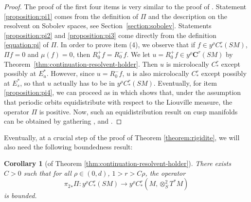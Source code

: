 \documentclass[10pt]{amsart}
\newcommand{\bC}{\boldsymbol{C}}
\theoremstyle{plain}
\newtheorem{corollary}{Corollary}[section]
\theoremstyle{definition}
\begin{document}
\begin{proof}
The proof of the first four items is very similar to the proof of \cite[Th.\,1.1]{Guillarmou-17-1}. Statement \eqref{proposition:pi1} comes from the definition of $\Pi$ and the description on the resolvent on Sobolev spaces, see Section~\ref{section:sobolev}. Statements \eqref{proposition:pi2} and \eqref{proposition:pi3} come directly from the definition \eqref{equation:pi} of $\Pi$. In order to prove item (4), we observe that if $f \in y^\rho C^r_*(SM)$, $\Pi f =0$ and $\mu(f) = 0$, then $R_0^+ f = R_0^- f$. We let $u= R_0^+ f \in y^\rho \bC^r(SM)$ by Theorem~\ref{thm:continuation-resolvent-holder}. Then $u$ is microlocally $C^r_*$ except possibly at $E^\ast_u$. However, since $u=R_0^- f$, $u$ is also microlocally $C^r_*$ except possibly at $E^\ast_s$, so that $u$ actually has to be in $y^\rho C^r_*(SM)$. Eventually, for item \eqref{proposition:pi4}, we can proceed as in \cite[p.\,58--59]{Lefeuvre-these} which shows that, under the assumption that periodic orbits equidistribute with respect to the Liouville measure, the operator $\Pi$ is positive. Now, such an equidistribution result on cusp manifolds can be obtained by gathering \cite[Th.\,7.2, p.\,145]{PPS-15}, \cite[Th.\,1.1]{Riquelme-2018} and \cite[Th.\,9.11]{PPS-15}.
\end{proof}

Eventually, at a crucial step of the proof of Theorem \ref{theorem:rigidite}, we will also need the following boundedness result:

\begin{corollary}[of Theorem \ref{thm:continuation-resolvent-holder}]
\label{corollary:key}
There exists $C \!>\! 0$ such that for all $\rho \!\in\! (0,d)$, $1>r > C\rho$, the operator
\[
{\pi_2}_* \Pi : y^\rho C^r_*(SM) \to y^\rho C^r_*(M,\otimes^2_S T^*M)
\]
is bounded.
\end{corollary}
\end{document}
